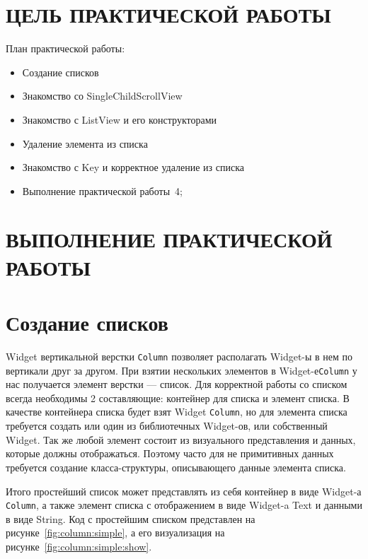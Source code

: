 \section*{ЦЕЛЬ ПРАКТИЧЕСКОЙ РАБОТЫ}

План практической работы:

\begin{itemize}
	\item Создание списков
	\item Знакомство со SingleChildScrollView
	\item Знакомство с ListView и его конструкторами
	\item Удаление элемента из списка
	\item Знакомство с Key и корректное удаление из списка
	\item Выполнение практической работы \No\,4;
\end{itemize}

\clearpage

\section*{ВЫПОЛНЕНИЕ ПРАКТИЧЕСКОЙ РАБОТЫ}

\section{Создание списков}

Widget вертикальной верстки \texttt{Column} позволяет располагать Widget-ы
в нем по вертикали друг за другом.
При взятии нескольких элементов в Widget-е\texttt{Column} 
у нас получается элемент верстки --- список.
Для корректной работы со списком всегда необходимы 2 составляющие:
контейнер для списка и элемент списка.
В качестве контейнера списка будет взят Widget \texttt{Column},
но для элемента списка требуется создать или один из библиотечных Widget-ов,
или собственный Widget.
Так же любой элемент состоит из визуального представления и данных,
которые должны отображаться.
Поэтому часто для не примитивных данных требуется создание класса-структуры,
описывающего данные элемента списка.\par
Итого простейший список может представлять из себя контейнер
в виде Widget-а \texttt{Column}, а также элемент списка
с отображением в виде Widget-a Text и данными в виде String.
Код с простейшим списком представлен на рисунке~\ref{fig:column:simple},
а его визуализация на рисунке~\ref{fig:column:simple:show}.

